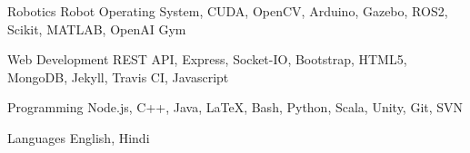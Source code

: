 
\begin{cvskills}

  \cvskill
    {Robotics}
    {Robot Operating System, CUDA, OpenCV, Arduino, Gazebo, ROS2, Scikit, MATLAB, OpenAI Gym}

  \cvskill
    {Web Development} %
    {REST API, Express, Socket-IO, Bootstrap, HTML5, MongoDB, Jekyll, Travis CI, Javascript} %

  \cvskill
    {Programming} %
    {Node.js, C++, Java, \LaTeX, Bash, Python, Scala, Unity, Git, SVN} %

  \cvskill
    {Languages} %
    {English, Hindi} %

\end{cvskills}
